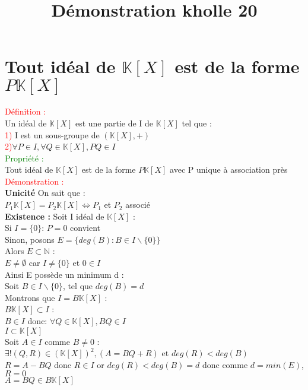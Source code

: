 \documentclass{article}
\begin{document}
\title{Démonstration kholle 20}
\date{}
\maketitle
	\renewcommand{\thesection}{\Roman{section}}
	\setlength{\parindent}{1.5cm}
\section{Tout idéal de $\mathbb K [X]$ est de la forme $P \mathbb K [X]$}
\textcolor{red}{Définition :} \\
Un idéal de $\mathbb{K}[X]$ est une partie de I de $\mathbb K [X]$ tel que : \\
\textcolor{red}{1)} I est un sous-groupe de $(\mathbb K[X],+)$ \\
\textcolor{red}{2)}$\forall P \in I, \forall Q \in \mathbb K[X], PQ \in I$ \\
\textcolor{green}{Propriété :} \\
Tout idéal de $\mathbb K [X]$ est de la forme $P \mathbb K[X]$ avec P unique à association près
\textcolor{red}{Démonstration :} \\
{\bf Unicité} On sait que : \\
$P_1 \mathbb K [X]=P_2 \mathbb K [X] \Leftrightarrow P_1$ et $P_2$ associé \\
{\bf Existence :} Soit I idéal de $\mathbb K [X] $ : \\
Si $I=\lbrace 0 \rbrace$: $P=0$ convient \\
Sinon, posons $E= \lbrace deg(B):B \in I \backslash \lbrace 0 \rbrace \rbrace $ \\
Alors $E \subset \mathbb{N}$ : \\
$E \neq \emptyset$ car $I \neq \lbrace 0 \rbrace$ et $0 \in I$ \\
Ainsi E possède un minimum d : \\
Soit $B \in I \backslash \lbrace 0 \rbrace$, tel que $deg(B)=d$ \\
Montrons que $I=B \mathbb K [X]$ : \\
{\boldmath$B \mathbb K [X] \subset I$ }: \\
$B \in I$ donc: $ \forall Q \in \mathbb K[X], BQ \in I$ \\
{\boldmath$I \subset \mathbb K [X]$} \\
Soit $A \in I$ comme $B \neq 0$ : \\
$\exists ! (Q,R) \in (\mathbb K [X])^2, (A=BQ+R)$ et $deg(R) < deg(B)$ \\
$R=A-BQ$ donc $R \in I$ or $deg(R)<deg(B)=d$ donc comme $d=min(E)$, $R=0$ \\
$A=BQ \in B \mathbb K [X]$
\end{document}
